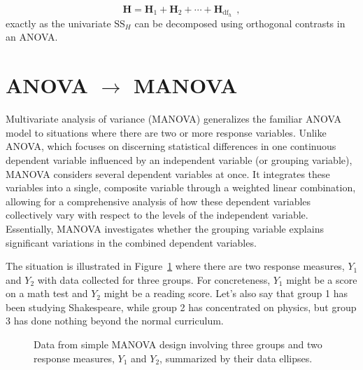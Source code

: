 \documentclass[
  letterpaper,
  10pt,
  krantz2]{krantz}
\begin{document}
\[
\mathbf{H} = \mathbf{H}_1 + \mathbf{H}_2 + \cdots + \mathbf{H}_{\text{df}_h} \:\: ,
\] exactly as the univariate \(\text{SS}_H\) can be decomposed using
orthogonal contrasts in an ANOVA.

\section{\texorpdfstring{ANOVA \(\rightarrow\)
MANOVA}{ANOVA \textbackslash rightarrow MANOVA}}\label{anova-rightarrow-manova}

Multivariate analysis of variance (MANOVA) generalizes the familiar
ANOVA model to situations where there are two or more response
variables. Unlike ANOVA, which focuses on discerning statistical
differences in one continuous dependent variable influenced by an
independent variable (or grouping variable), MANOVA considers several
dependent variables at once. It integrates these variables into a
single, composite variable through a weighted linear combination,
allowing for a comprehensive analysis of how these dependent variables
collectively vary with respect to the levels of the independent
variable. Essentially, MANOVA investigates whether the grouping variable
explains significant variations in the combined dependent variables.

The situation is illustrated in Figure~\ref{fig-manova-diagram} where
there are two response measures, \(Y_1\) and \(Y_2\) with data collected
for three groups. For concreteness, \(Y_1\) might be a score on a math
test and \(Y_2\) might be a reading score. Let's also say that group 1
has been studying Shakespeare, while group 2 has concentrated on
physics, but group 3 has done nothing beyond the normal curriculum.

\begin{figure}


\caption{\label{fig-manova-diagram}Data from simple MANOVA design
involving three groups and two response measures, \(Y_1\) and \(Y_2\),
summarized by their data ellipses.}

\end{figure}%
\end{document}

